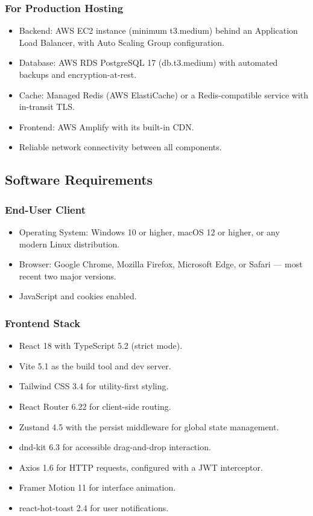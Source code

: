 \subsubsection{For Production Hosting}
\begin{itemize}
    \item Backend: AWS EC2 instance (minimum t3.medium) behind an Application Load Balancer, with Auto Scaling Group configuration.
    \item Database: AWS RDS PostgreSQL 17 (db.t3.medium) with automated backups and encryption-at-rest.
    \item Cache: Managed Redis (AWS ElastiCache) or a Redis-compatible service with in-transit TLS.
    \item Frontend: AWS Amplify with its built-in CDN.
    \item Reliable network connectivity between all components.
\end{itemize}

\subsection{Software Requirements}

\subsubsection{End-User Client}
\begin{itemize}
    \item Operating System: Windows 10 or higher, macOS 12 or higher, or any modern Linux distribution.
    \item Browser: Google Chrome, Mozilla Firefox, Microsoft Edge, or Safari --- most recent two major versions.
    \item JavaScript and cookies enabled.
\end{itemize}

\subsubsection{Frontend Stack}
\begin{itemize}
    \item React 18 with TypeScript 5.2 (strict mode).
    \item Vite 5.1 as the build tool and dev server.
    \item Tailwind CSS 3.4 for utility-first styling.
    \item React Router 6.22 for client-side routing.
    \item Zustand 4.5 with the persist middleware for global state management.
    \item dnd-kit 6.3 for accessible drag-and-drop interaction.
    \item Axios 1.6 for HTTP requests, configured with a JWT interceptor.
    \item Framer Motion 11 for interface animation.
    \item react-hot-toast 2.4 for user notifications.
\end{itemize}

